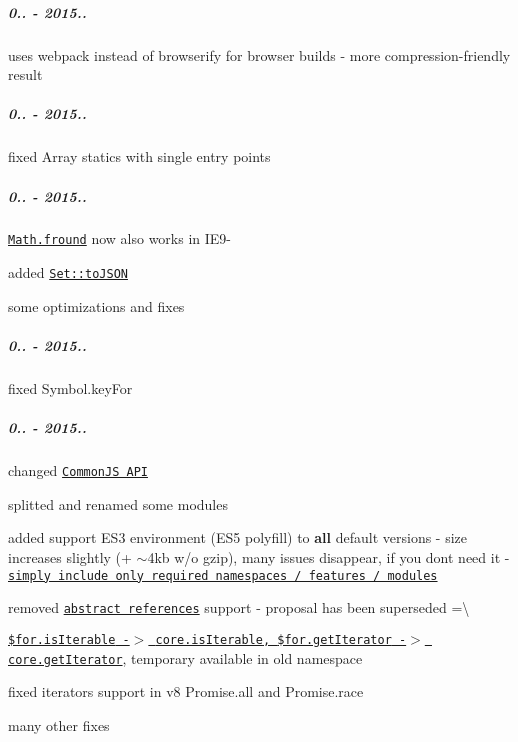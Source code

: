 \subparagraph*{0.. -\/ 2015..}


\begin{DoxyItemize}
\item uses {\ttfamily webpack} instead of {\ttfamily browserify} for browser builds -\/ more compression-\/friendly result
\end{DoxyItemize}

\subparagraph*{0.. -\/ 2015..}


\begin{DoxyItemize}
\item fixed {\ttfamily Array} statics with single entry points
\end{DoxyItemize}

\subparagraph*{0.. -\/ 2015..}


\begin{DoxyItemize}
\item \href{https://github.com/zloirock/core-js/#ecmascript-6-math}{\tt {\ttfamily Math.\+fround}} now also works in I\+E9-\/
\item added \href{https://github.com/zloirock/core-js/#ecmascript-7}{\tt {\ttfamily Set\+::to\+J\+S\+ON}}
\item some optimizations and fixes
\end{DoxyItemize}

\subparagraph*{0.. -\/ 2015..}


\begin{DoxyItemize}
\item fixed {\ttfamily Symbol.\+key\+For}
\end{DoxyItemize}

\subparagraph*{0.. -\/ 2015..}


\begin{DoxyItemize}
\item changed \href{https://github.com/zloirock/core-js/#commonjs}{\tt Common\+JS A\+PI}
\item splitted and renamed some modules
\item added support E\+S3 environment (E\+S5 polyfill) to {\bfseries all} default versions -\/ size increases slightly (+ $\sim$4kb w/o gzip), many issues disappear, if you don\textquotesingle{}t need it -\/ \href{https://github.com/zloirock/core-js/#commonjs}{\tt simply include only required namespaces / features / modules}
\item removed \href{https://github.com/zenparsing/es-abstract-refs}{\tt abstract references} support -\/ proposal has been superseded =\textbackslash{}
\item \href{https://github.com/zloirock/core-js/#ecmascript-6-iterators}{\tt {\ttfamily \$for.\+is\+Iterable} -\/$>$ {\ttfamily core.\+is\+Iterable}, {\ttfamily \$for.\+get\+Iterator} -\/$>$ {\ttfamily core.\+get\+Iterator}}, temporary available in old namespace
\item fixed iterators support in v8 {\ttfamily Promise.\+all} and {\ttfamily Promise.\+race}
\item many other fixes
\end{DoxyItemize}

